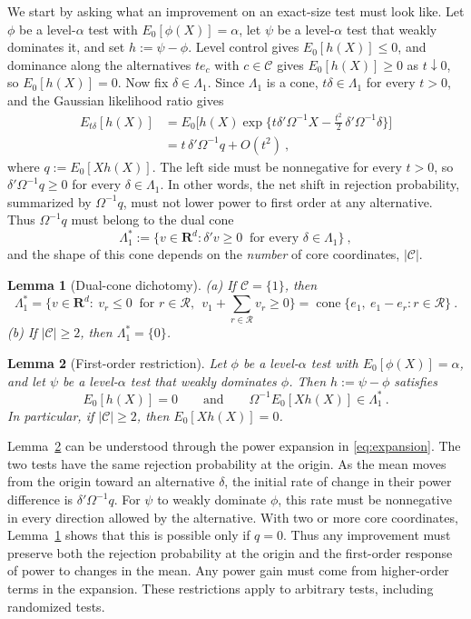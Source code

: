 \documentclass[11pt]{article}
\numberwithin{equation}{section}
\newtheorem{lemma}{Lemma}
\theoremstyle{definition}
\begin{document}
We start by asking what an improvement on an exact-size test must look like. Let $\phi$ be a level-$\alpha$ test with $E_0[\phi(X)]=\alpha$, let $\psi$ be a level-$\alpha$ test that weakly dominates it, and set $h:=\psi-\phi$. Level control gives $E_0[h(X)]\le0$, and dominance along the alternatives $te_c$ with $c\in\mathcal C$ gives $E_0[h(X)]\ge0$ as $t\downarrow0$, so $E_0[h(X)]=0$. Now fix $\delta\in\Lambda_1$. Since $\Lambda_1$ is a cone, $t\delta\in\Lambda_1$ for every $t>0$, and the Gaussian likelihood ratio gives
\begin{equation}\label{eq:expansion}
  \begin{split}
  E_{t\delta}[h(X)]
  &=E_0\Big[h(X)\exp\Big\{t\delta'\Omega^{-1}X-\frac{t^2}{2}\,\delta'\Omega^{-1}\delta\Big\}\Big]\\
  &=t\,\delta'\Omega^{-1}q+O(t^2)~,
  \end{split}
  \end{equation}
  where $q:=E_0[Xh(X)]$. The left side must be nonnegative for every $t>0$, so $\delta'\Omega^{-1}q\ge0$ for every $\delta\in\Lambda_1$. In other words, the net shift in rejection probability, summarized by $\Omega^{-1}q$, must not lower power to first order at any alternative. Thus $\Omega^{-1}q$ must belong to the dual cone
\[
\Lambda_1^*:=\{v\in\mathbf R^d:\delta'v\ge0\ \text{ for every }\delta\in\Lambda_1\}~,
\]
and the shape of this cone depends on the \emph{number} of core coordinates, $|\mathcal C|$.

\begin{lemma}[Dual-cone dichotomy]\label{lem:dual}
(a) If $\mathcal C=\{1\}$, then
\[
\Lambda_1^*
=\Big\{v\in\mathbf R^d:\ v_r\le0\ \text{ for } r\in\mathcal R,\ \ v_1+\sum_{r\in\mathcal R}v_r\ge0\Big\}
=\operatorname{cone}\{e_1,\ e_1-e_r:r\in\mathcal R\}~.
\]
(b) If $|\mathcal C|\ge2$, then $\Lambda_1^*=\{0\}$.
\end{lemma}

\begin{lemma}[First-order restriction]\label{lem:first-order}
Let $\phi$ be a level-$\alpha$ test with $E_0[\phi(X)]=\alpha$, and let $\psi$ be a level-$\alpha$ test that weakly dominates $\phi$. Then $h:=\psi-\phi$ satisfies
\[
E_0[h(X)]=0
\qquad\text{and}\qquad
\Omega^{-1}E_0[Xh(X)]\in\Lambda_1^*~.
\]
In particular, if $|\mathcal C|\ge2$, then $E_0[Xh(X)]=0$.
\end{lemma}

Lemma~\ref{lem:first-order} can be understood through the power expansion in \eqref{eq:expansion}. The two tests have the same rejection probability at the origin. As the mean moves from the origin toward an alternative $\delta$, the initial rate of change in their power difference is $\delta'\Omega^{-1}q$. For $\psi$ to weakly dominate $\phi$, this rate must be nonnegative in every direction allowed by the alternative. With two or more core coordinates, Lemma~\ref{lem:dual} shows that this is possible only if $q=0$. Thus any improvement must preserve both the rejection probability at the origin and the first-order response of power to changes in the mean. Any power gain must come from higher-order terms in the expansion. These restrictions apply to arbitrary tests, including randomized tests.
\end{document}
